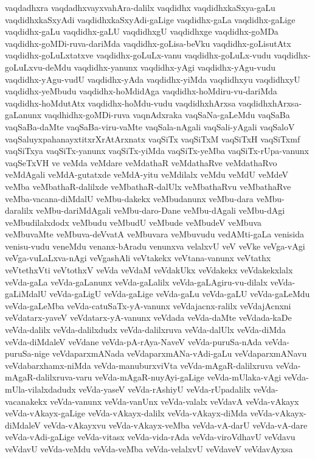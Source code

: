 {vaqdadhxra
vaqdadhxvayxvahAra-dalilx
vaqdidhx
vaqdidhxkaSxya-gaLu
vaqdidhxkaSxyAdi
vaqdidhxkaSxyAdi-gaLige
vaqdidhx-gaLa
vaqdidhx-gaLige
vaqdidhx-gaLu
vaqdidhx-gaLU
vaqdidhxgU
vaqdidhxge
vaqdidhx-goMDa
vaqdidhx-goMDi-ruva-dariMda
vaqdidhx-goLisa-beVku
vaqdidhx-goLisutAtx
vaqdidhx-goLuLxtatxve
vaqdidhx-goLuLx-vanu
vaqdidhx-goLuLx-vudu
vaqdidhx-goLuLxvu-deMdu
vaqdidhx-yanunx
vaqdidhx-yAgi
vaqdidhx-yAgu-vudu
vaqdidhx-yAgu-vudU
vaqdidhx-yAda
vaqdidhx-yiMda
vaqdidhxyu
vaqdidhxyU
vaqdidhx-yeMbudu
vaqdidhx-hoMdidAga
vaqdidhx-hoMdiru-vu-dariMda
vaqdidhx-hoMdutAtx
vaqdidhx-hoMdu-vudu
vaqdidhxhArxsa
vaqdidhxhArxsa-gaLanunx
vaqdhidhx-goMDi-ruva
vaqnAdxraka
vaqSaNa-gaLeMdu
vaqSaBa
vaqSaBa-daMte
vaqSaBa-viru-vaMte
vaqSala-nAgali
vaqSali-yAgali
vaqSaloV
vaqSaluyxpahanayxtitxrXrAtArxnatx
vaqSiTx
vaqSiTxM
vaqSiTxH
vaqSiTxmf
vaqSiTxya
vaqSiTx-yanunx
vaqSiTx-yiMda
vaqSiTx-yeMba
vaqSiTx-rUpa-vanunx
vaqSeTxVH
ve
veMda
veMdare
veMdathaR
veMdathaRve
veMdathaRvo
veMdAgali
veMdA-gutatxde
veMdA-yitu
veMdilalx
veMdu
veMdU
veMdeV
veMba
veMbathaR-dalilxde
veMbathaR-dalUlx
veMbathaRvu
veMbathaRve
veMba-vacana-diMdalU
veMbu-dakekx
veMbudanunx
veMbu-dara
veMbu-daralilx
veMbu-dariMdAgali
veMbu-daro-Dane
veMbu-dAgali
veMbu-dAgi
veMbudilalxdodx
veMbudu
veMbudU
veMbude
veMbudeV
veMbuva
veMbuvaMte
veMbuva-deVvatA
veMbuvara
veMbuvudu
vedAMti-gaLa
venisida
venisu-vudu
veneMdu
venanx-bAradu
venunxva
velalxvU
veV
veVke
veVga-vAgi
veVga-vuLaLxva-nAgi
veVgashAli
veVtakekx
veVtana-vanunx
veVtathx
veVtethxVti
veVtothxV
veVda
veVdaM
veVdakUkx
veVdakekx
veVdakekxlalx
veVda-gaLa
veVda-gaLanunx
veVda-gaLalilx
veVda-gaLAgiru-vu-dilalx
veVda-gaLiMdalU
veVda-gaLigU
veVda-gaLige
veVda-gaLu
veVda-gaLU
veVda-gaLeMdu
veVda-gaLeMba
veVda-catuSaTx-yA-vanunx
veVdajacnx-ralilx
veVdajAcnxni
veVdatarx-yaveV
veVdatarx-yA-vanunx
veVdada
veVda-daMte
veVdada-kaDe
veVda-dalilx
veVda-dalilxdudx
veVda-dalilxruva
veVda-dalUlx
veVda-diMda
veVda-diMdaleV
veVdane
veVda-pA-rAya-NaveV
veVda-puruSa-nAda
veVda-puruSa-nige
veVdaparxmANada
veVdaparxmANa-vAdi-gaLu
veVdaparxmANavu
veVdabarxhamx-niMda
veVda-manuburxviVta
veVda-mAgaR-dalilxruva
veVda-mAgaR-dalilxruva-varu
veVda-mAgaR-nuyAyi-gaLige
veVda-mUlaka-vAgi
veVda-mUla-vilalxdadudx
veVda-yaseV
veVda-rAshiyU
veVda-rUpadalilx
veVda-vacanakekx
veVda-vanunx
veVda-vanUnx
veVda-valalx
veVdavA
veVda-vAkayx
veVda-vAkayx-gaLige
veVda-vAkayx-dalilx
veVda-vAkayx-diMda
veVda-vAkayx-diMdaleV
veVda-vAkayxvu
veVda-vAkayx-veMba
veVda-vA-darU
veVda-vA-dare
veVda-vAdi-gaLige
veVda-vitasx
veVda-vida-rAda
veVda-viroVdhavU
veVdavu
veVdavU
veVda-veMdu
veVda-veMba
veVda-velalxvU
veVdaveV
veVdavAyxsa
}
